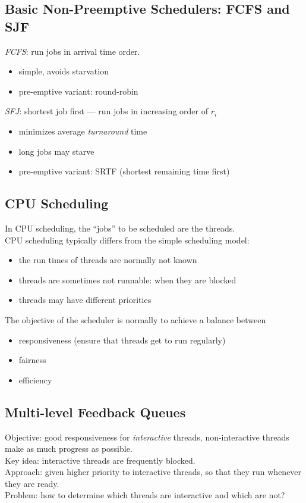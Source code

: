 \documentclass[12pt]{article}
\theoremstyle{plain}
\theoremstyle{definition}
\begin{document}
\subsection{Basic Non-Preemptive Schedulers: FCFS and SJF}
\emph{FCFS}: run jobs in arrival time order.
\begin{itemize}
  \item simple, avoids starvation
  \item pre-emptive variant: round-robin
\end{itemize}

\emph{SFJ}: shortest job first --- run jobs in increasing order of $r_{i}$
\begin{itemize}
  \item minimizes average \emph{turnaround} time
  \item long jobs may starve
  \item pre-emptive variant: SRTF (shortest remaining time first)
\end{itemize}

\subsection{CPU Scheduling}
In CPU scheduling, the ``jobs'' to be scheduled are the threads. \\
CPU scheduling typically differs from the simple scheduling model:
\begin{itemize}
  \item the run times of threads are normally not known
  \item threads are sometimes not runnable: when they are blocked
  \item threads may have different priorities
\end{itemize}

The objective of the scheduler is normally to achieve a balance between
\begin{itemize}
  \item responsiveness (ensure that threads get to run regularly)
  \item fairness
  \item efficiency
\end{itemize}

\subsection{Multi-level Feedback Queues}
Objective: good responsiveness for \emph{interactive} threads, non-interactive threads make as much progress as possible. \\
Key idea: interactive threads are frequently blocked. \\
Approach: given higher priority to interactive threads, so that they run whenever they are ready. \\
Problem: how to determine which threads are interactive and which are not? \\
\end{document}
